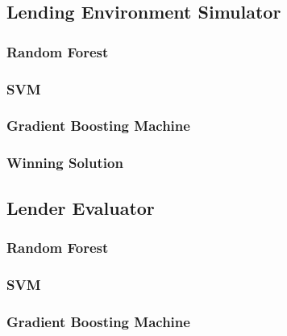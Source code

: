 \hypertarget{lending-environment-simulator}{%
\subsection{Lending Environment
Simulator}\label{lending-environment-simulator}}

\hypertarget{random-forest}{%
\subsubsection{Random Forest}\label{random-forest}}

\hypertarget{svm}{%
\subsubsection{SVM}\label{svm}}

\hypertarget{gradient-boosting-machine}{%
\subsubsection{Gradient Boosting
Machine}\label{gradient-boosting-machine}}

\hypertarget{winning-solution}{%
\subsubsection{Winning Solution}\label{winning-solution}}

\hypertarget{lender-evaluator-1}{%
\subsection{Lender Evaluator}\label{lender-evaluator-1}}

\hypertarget{random-forest-1}{%
\subsubsection{Random Forest}\label{random-forest-1}}

\hypertarget{svm-1}{%
\subsubsection{SVM}\label{svm-1}}

\hypertarget{gradient-boosting-machine-1}{%
\subsubsection{Gradient Boosting
Machine}\label{gradient-boosting-machine-1}}

